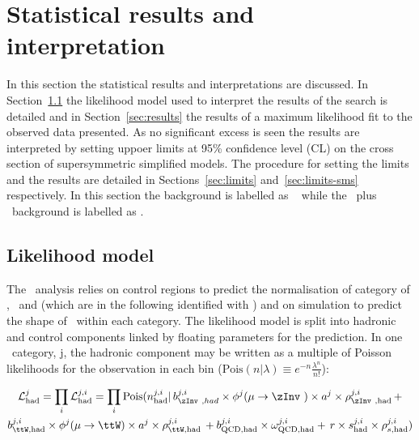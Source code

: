 \chapter{Statistical results and interpretation}
\label{cha:statisticalResults}

In this section the statistical results and interpretations are discussed.
In Section~\ref{sec:likelihood} the likelihood model used to interpret the results of the \alphat search is
detailed and in Section~\ref{sec:results} the results of a maximum likelihood fit to the observed data presented. 
As no significant excess is seen the results are interpreted by setting uppoer limits at 95\% confidence 
level (CL) on the cross section of supersymmetric simplified models. The procedure for setting the limits and 
the results are detailed in Sections~\ref{sec:limits} and~\ref{sec:limits-sms} respectively.
In this section the \znunu background is labelled as \zInv~ while 
the \ttj~plus \wj~background is labelled as \ttW.

\section{Likelihood model}
\label{sec:likelihood}

The \alphat~analysis relies on control regions to predict the normalisation of category of \njet, \nb~and \scalht 
(which are in the following identified with \htcat) and on simulation to predict the shape 
of \mht~within each category. The likelihood model is split into hadronic and control components
linked by floating parameters for the prediction. In one \htcat~category, j, 
the hadronic component may be written as a multiple of Poisson likelihoods
for the observation in each \mht bin 
($\mathrm{Pois}(n|\lambda) \equiv e^{-n}\frac{\lambda^{n}}{n!}$):

\begin{multline}
\label{eq:hadronicLikelihood}
\mathcal{L}^{j}_{\mathrm{had}} = \prod_i \mathcal{L}^{j,i}_{\mathrm{had}} = \prod_i \mathrm{Pois}(n^{j,i}_{\mathrm{had}} |\, b^{j,i}_{\zInv~,had}\times\phi^{j}(\mu\rightarrow\zInv~)\times a^{j}\times\rho^{j,i}_{\zInv~,\mathrm{had}}\, + \\ 
b^{j,i}_{\ttW,\mathrm{had}}\times\phi^{j}(\mu\rightarrow\ttW)\times a^{j}\times\rho^{j,i}_{\ttW,\mathrm{had}}\, + b^{j,i}_{\text{QCD},\mathrm{had}}\times\omega^{j,i}_{\text{QCD},\mathrm{had}} + \,r\times s^{j,i}_{\mathrm{had}}\times\rho^{j,i}_{s,\mathrm{had}}) 
\end{multline}

